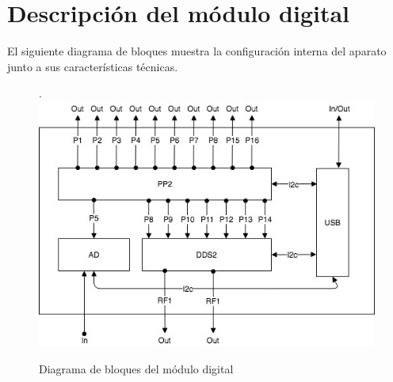 \section{Descripci\'on del m\'odulo digital}

El siguiente diagrama de bloques muestra la configuraci\'on interna 
del aparato junto a sus caracter\'isticas t\'ecnicas.

\begin{figure}[!htb].
    \includegraphics[width=\linewidth]{../figures/d6.jpg}
    \caption{Diagrama de bloques del m\'odulo digital}
    \label{fig:d6}
\end{figure}


\newpage
